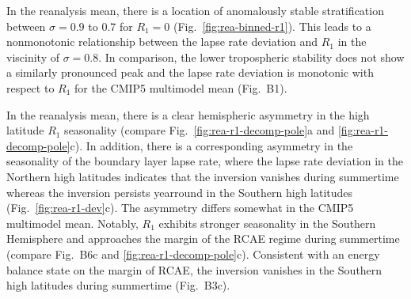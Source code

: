 \documentclass{ametsocV5}
\begin{document}
\appendix[B]
In the reanalysis mean, there is a location of anomalously stable stratification between $\sigma=0.9$ to 0.7 for $R_1=0$ (Fig.~\ref{fig:rea-binned-r1}). This leads to a nonmonotonic relationship between the lapse rate deviation and $R_1$ in the viscinity of $\sigma=0.8$. In comparison, the lower tropospheric stability does not show a similarly pronounced peak and the lapse rate deviation is monotonic with respect to $R_1$ for the CMIP5 multimodel mean (Fig.~B1).

In the reanalysis mean, there is a clear hemispheric asymmetry in the high latitude $R_1$ seasonality (compare Fig.~\ref{fig:rea-r1-decomp-pole}a and \ref{fig:rea-r1-decomp-pole}c). In addition, there is a corresponding asymmetry in the seasonality of the boundary layer lapse rate, where the lapse rate deviation in the Northern high latitudes indicates that the inversion vanishes during summertime whereas the inversion persists yearround in the Southern high latitudes (Fig.~\ref{fig:rea-r1-dev}c). The asymmetry differs somewhat in the CMIP5 multimodel mean. Notably, $R_1$ exhibits stronger seasonality in the Southern Hemisphere and approaches the margin of the RCAE regime during summertime (compare Fig.~B6c and \ref{fig:rea-r1-decomp-pole}c). Consistent with an energy balance state on the margin of RCAE, the inversion vanishes in the Southern high latitudes during summertime (Fig.~B3c).
\end{document}
